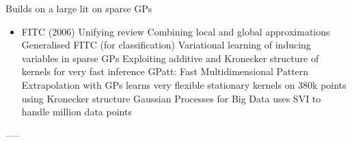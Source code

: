 Builds on a large lit on sparse GPs 

\begin{itemize}
\item FITC (2006) 
\imm Unifying review 
\imm Combining local and global approximations 
\imm Generalised FITC (for classification) 
\imm Variational learning of inducing variables in sparse GPs 
\imm Exploiting additive and Kronecker structure of kernels for very fast
  inference  
\imm GPatt: Fast Multidimensional Pattern Extrapolation with GPs  learns very flexible stationary kernels on 380k points using
Kronecker structure
\imm Gaussian Processes for Big Data  uses SVI to handle million data points
\end{itemize}






-----



\vspace*{-3ex}

